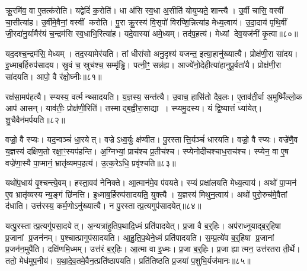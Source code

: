 क्रू॒रमि॑व॒ वा ए॒तत्क॑रोति।
यद्वेदिं॑ क॒रोति॑।
धा अ॑सि स्व॒धा अ॒सीति॑ योयुप्यते॒ शान्त्यै।
उ॒र्वी चासि॒ वस्वी॑ चा॒सीत्या॑ह।
उ॒र्वीमे॒वैनां॒ वस्वीं करोति।
पु॒रा क्रू॒रस्य॑ वि॒सृपो॑ विरप्शि॒न्नित्या॑ह मेध्य॒त्वाय॑।
उ॒दा॒दाय॑ पृथि॒वीं जी॒रदा॑नु॒र्यामैर॑यं च॒न्द्रम॑सि स्व॒धाभि॒रित्या॑ह।
यदे॒वास्या॑ अमे॒ध्यम्।
तद॑प॒हत्य॑।
मेध्यां देव॒यज॑नीं कृ॒त्वा॥८०॥

यद॒दश्च॒न्द्रम॑सि॒ मेध्यम्।
तद॒स्यामेर॑यति।
तां धीरा॑सो अनु॒दृश्य॑ यजन्त॒ इत्या॒हानु॑ख्यात्यै।
प्रोक्ष॑णी॒रा सा॑दय।
इ॒ध्माब॒र्\mbox{}हिरुप॑सादय।
स्रु॒वं च॒ स्रुच॑श्च॒ सम्मृ॑ड्ढि।
पत्नी॒ꣳ॒ सन्न॑ह्य।
आज्ये॑नो॒देहीत्या॑हानुपू॒र्वता॑यै।
प्रोक्ष॑णी॒रा सा॑दयति।
आपो॒ वै र॑क्षो॒घ्नीः॥८१॥

रक्ष॑सा॒मप॑हत्यै।
स्प्यस्य॒ वर्त्मन्थ्सादयति।
य॒ज्ञस्य॒ सन्त॑त्यै।
उ॒वाच॒ हासि॑तो दैव॒लः।
ए॒ताव॑ती॒र्वा अ॒मुष्मिँ॑ल्लो॒क आप॑ आसन्।
याव॑तीः॒ प्रोक्ष॑णी॒रिति॑।
तस्माद्ब॒ह्वीरा॒साद्या।
स्प्यमु॒दस्य\sn{}।
यं द्वि॒ष्यात्तं ध्या॑येत्।
शु॒चैवैन॑मर्पयति॥८२॥

वज्रो॒ वै स्प्यः।
यद॒न्वञ्चं॑ धा॒रयेत्।
वज्रे\-ऽध्व॒र्युः क्ष॑ण्वीत।
पु॒रस्तात्ति॒र्यञ्चं॑ धारयति।
वज्रो॒ वै स्प्यः।
वज्रे॑णै॒व य॒ज्ञस्य॑ दक्षिण॒तो रक्षा॒ꣳ॒स्यप॑हन्ति।
अ॒ग्निभ्यां॒ प्राच॑श्च प्र॒तीच॑श्च।
स्प्येनोदी॑चश्चाध॒राच॑श्च।
स्प्येन॒ वा ए॒ष वज्रे॑णा॒स्यै पा॒प्मानं॒ भ्रातृ॑व्यमप॒हत्य॑।
उ॒त्क॒रेऽधि॒ प्रवृ॑श्चति॥८३॥

यथो॑प॒धाय॑ वृ॒श्चन्त्ये॒वम्।
हस्ता॒वव॑ नेनिक्ते।
आ॒त्मान॑मे॒व प॑वयते।
स्प्यं प्रक्षा॑लयति मेध्य॒त्वाय॑।
अथो॑ पा॒प्मन॑ ए॒व भ्रातृ॑व्यस्य न्य॒ङ्गं छि॑नत्ति।
इ॒ध्माब॒र्\mbox{}हिरुप॑सादयति॒ युक्त्यै।
य॒ज्ञस्य॑ मिथुन॒त्वाय॑।
अथो॑ पुरो॒रुच॑मे॒वैतां द॑धाति।
उत्त॑रस्य॒ कर्म॒णो\-ऽनु॑ख्यात्यै।
न पु॒रस्तात्प्र॒त्यगुप॑सादयेत्॥८४॥

यत्पु॒रस्तात्प्र॒त्यगु॑पसा॒दयेत्।
अ॒न्यत्रा॑हुतिप॒थादि॒ध्मं प्रति॑पादयेत्।
प्र॒जा वै ब॒र्॒हिः।
अप॑राध्नुयाद्ब॒र्॒हिषा प्र॒जानां प्र॒जन॑नम्।
प॒श्चात्प्रागुप॑सादयति।
आ॒हु॒ति॒प॒थेने॒ध्मं प्रति॑पादयति।
स॒म्प्र॒त्ये॑व ब॒र्॒हिषा प्र॒जानां प्र॒जन॑न॒मुपै॑ति।
दक्षि॑णमि॒ध्मम्।
उत्त॑रं ब॒र्॒हिः।
आ॒त्मा वा इ॒ध्मः।
प्र॒जा ब॒र्॒हिः।
प्र॒जा ह्यात्मन॒ उत्त॑रतरा ती॒र्थे।
ततो॒ मेध॑मुप॒नीय॑।
य॒था॒दे॒व॒तमे॒वैन॒त्प्रति॑ष्ठापयति।
प्रति॑तिष्ठति प्र॒जया॑ प॒शुभि॒र्यज॑मानः॥८५॥\anuvakamend[वृ॒श्च॒ति॒ सा॒द॒ये॒दि॒ध्मः पञ्च॑ च]




\clearpage
{}
\setcounter{anuvakam}{0}

